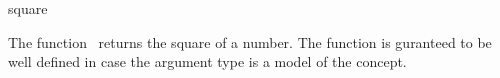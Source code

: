 \begin{ccRefFunction}{square}

\ccDefinition

The function \ccRefName\ returns the square of a number.
The function is guranteed to be well defined in case the argument type 
is a model of the  concept. 


{}

\ccSeeAlso

\\
\\

\end{ccRefFunction}
